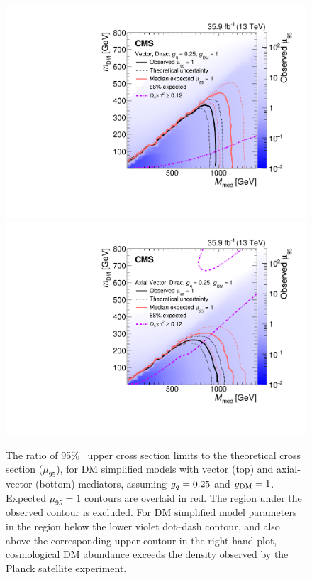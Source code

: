 \begin{figure}[htbp]
  \centering
    \includegraphics[width=0.45\textheight]{Analysis/Figures/limits_vector.pdf}
    \includegraphics[width=0.45\textheight]{Analysis/Figures/limits_axial.pdf}
    \caption{
      The ratio of 95\% \CL\ upper cross section limits to the theoretical cross section ($\mu_{95}$), for DM simplified models with vector (top) and axial-vector (bottom) mediators, assuming $g_{{q}}=0.25$ and $g_{\text{DM}}=1$.
      Expected $\mu_{95} = 1$ contours are overlaid in red. 
      The region under the observed contour is excluded. For DM simplified model parameters in the region below the lower violet dot--dash contour, and also above the corresponding upper contour in the right hand plot, cosmological DM abundance exceeds the density observed by the Planck satellite experiment.
    }
    \label{fig:limits}
\end{figure}


